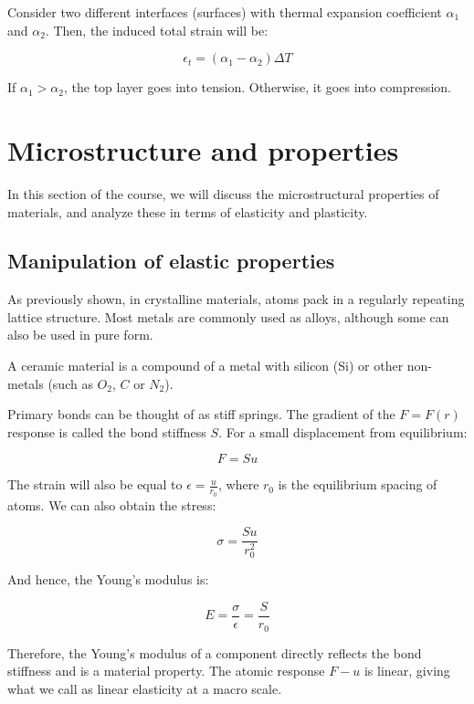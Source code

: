 \documentclass{article}
\begin{document}
\begin{proposition}
    Consider two different interfaces (surfaces) with thermal expansion coefficient $\alpha_1$ and $\alpha_2$. Then, the induced total strain will be:

    \[ \epsilon_t = (\alpha_1 - \alpha_2)\Delta T \]

    If $\alpha_1 > \alpha_2$, the top layer goes into tension. Otherwise, it goes into compression.
\end{proposition}

\newpage

\section{Microstructure and properties}

In this section of the course, we will discuss the microstructural properties of materials, and analyze these in terms of elasticity and plasticity.

\subsection{Manipulation of elastic properties}

As previously shown, in crystalline materials, atoms pack in a regularly repeating lattice structure. Most metals are commonly used as alloys, although some can also be used in pure form.

\begin{definition}[Ceramic]
    A ceramic material is a compound of a metal with silicon (Si) or other non-metals (such as $O_2$, $C$ or $N_2$).
\end{definition}

\begin{proposition}
    Primary bonds can be thought of as stiff springs. The gradient of the $F = F(r)$ response is called the bond stiffness $S$. For a small displacement from equilibrium:

    \[ F = Su \]

    The strain will also be equal to $\epsilon = \frac{u}{r_0}$, where $r_0$ is the equilibrium spacing of atoms. We can also obtain the stress:

    \[ \sigma = \frac{Su}{r_0^2} \]

    And hence, the Young's modulus is:

    \[ E = \frac{\sigma}{\epsilon} = \frac{S}{r_0} \]

    Therefore, the Young's modulus of a component directly reflects the bond stiffness and is a material property. The atomic response $F - u$ is linear, giving what we call as linear elasticity at a macro scale.
\end{proposition}
\end{document}
